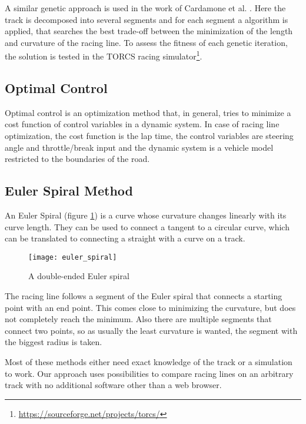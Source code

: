 A similar genetic approach is used in the work of Cardamone et al. \cite{cardamone10}. Here the track is decomposed into several segments and for each segment a algorithm is applied, that searches the best trade-off between the minimization of the length and curvature of the racing line. To assess the fitness of each genetic iteration, the solution is tested in the TORCS racing simulator\footnote{\url{https://sourceforge.net/projects/torcs/}}.

\subsection{Optimal Control}
Optimal control is an optimization method that, in general, tries to minimize a cost function of control variables in a dynamic system. In case of racing line optimization, the cost function is the lap time, the control variables are steering angle and throttle/break input and the dynamic system is a vehicle model restricted to the boundaries of the road. \cite{gustafsson08,brayshaw05}
\clearpage
\subsection{Euler Spiral Method}
An Euler Spiral (figure \ref{fig:euler_spiral}) is a curve whose curvature changes linearly with its curve length. They can be used to connect a tangent to a circular curve, which can be translated to connecting a straight with a curve on a track. \cite{xiong09}

\begin{figure}[!ht]
	\centering
	\texttt{[image: euler\_spiral]}
	\caption{A double-ended Euler spiral}
	\label{fig:euler_spiral}
\end{figure}

The racing line follows a segment of the Euler spiral that connects a starting point with an end point. This comes close to minimizing the curvature, but does not completely reach the minimum. Also there are multiple segments that connect two points, so as usually the least curvature is wanted, the segment with the biggest radius is taken.

Most of these methods either need exact knowledge of the track or a simulation to work. Our approach uses possibilities to compare racing lines on an arbitrary track with no additional software other than a web browser.

\clearpage